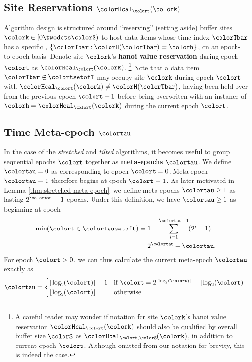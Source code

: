\subsection{Site Reservations $\colorHcal_{\colort}(\colork)$}
\label{sec:notation-reservation}

Algorithm design is structured around ``reserving'' (setting aside) buffer sites $\colork \in [0 \twodots \colorS)$ to host data items whose time index $\colorTbar$ has a specific \hv{}, $\{\colorTbar : \colorH(\colorTbar) = \colorh \}$, on an epoch-to-epoch-basis.
Denote site $\colork$'s \textbf{hanoi value reservation} during epoch $\colort$ as $\colorHcal_{\colort}(\colork)$.%
\footnote{
A careful reader may wonder if notation for site $\colork$'s hanoi value reservation $\colorHcal_{\colort}(\colork)$ should also be qualified by overall buffer size $\colorS$ as $\colorHcal_{\colort,\colorS}(\colork)$, in addition to current epoch $\colort$.
Although omitted from our notation for brevity, this is indeed the case.
}
Note that a data item $\colorTbar \not\in \colortsetofT$ may occupy site $\colork$ during epoch $\colort$ with $\colorHcal_{\colort}(\colork) \neq \colorH(\colorTbar)$, having been held over from the previous epoch $\colort - 1$ before being overwriten with an instance of \hv{} $\colorh = \colorHcal_{\colort}(\colork)$ during the current epoch $\colort$.

\subsection{Time Meta-epoch $\colortau$}
\label{sec:notation-metaepoch}

In the case of the \textit{stretched} and \textit{tilted} algorithms, it becomes useful to group sequential epochs $\colort$ together as \textbf{meta-epochs} $\colortau$.
We define $\colortau=0$ as corresponding to epoch $\colort=0$.
Meta-epoch $\colortau=1$ therefore begins at epoch $\colort = 1$.
As later motivated in Lemma \ref{thm:stretched-meta-epoch}, we define meta-epochs $\colortau\geq1$ as lasting $2^{\colortau} - 1$ epochs.
Under this definition, we have $\colortau\geq1$ as beginning at epoch
\begin{align}
\min(\colort \in \colortausetoft)
&= 1 + \sum_{i=1}^{\colortau - 1} (2^{i} - 1) \\
&= 2^{\colortau} - \colortau.
\label{eqn:meta-epoch-defn}
\end{align}
For epoch $\colort > 0$, we can thus calculate the current meta-epoch $\colortau$ exactly as
\begin{align*}
\colortau
=
\begin{cases}
\left\lfloor \log_2(\colort) \right\rfloor + 1 & \text{if } \colort = 2^{\left\lfloor \log_2(\colort) \right\rfloor} - \left\lfloor \log_2(\colort) \right\rfloor \\
\left\lfloor \log_2(\colort) \right\rfloor & \text{otherwise.}
\end{cases}
\end{align*}

